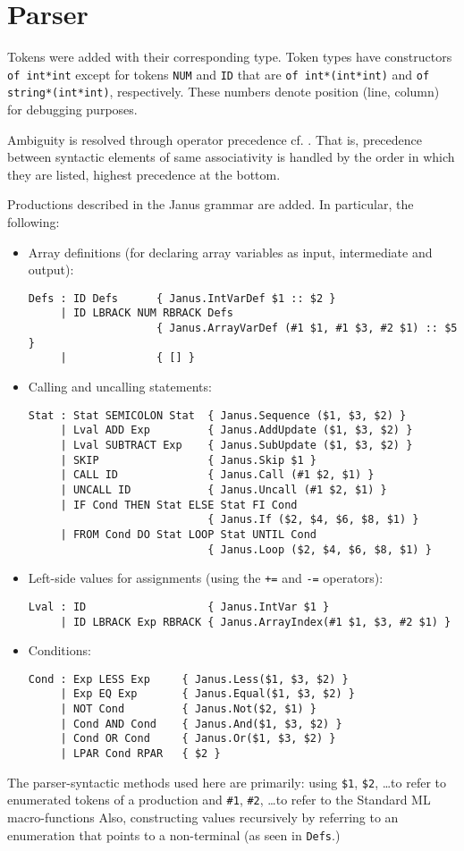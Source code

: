\section{Parser}
Tokens were added with their corresponding type. Token types have constructors
\verb+of int*int+ except for tokens \verb+NUM+ and \verb+ID+ that are
\verb+of int*(int*int)+ and \verb+of string*(int*int)+, respectively. These
numbers denote position (line, column) for debugging purposes.

Ambiguity is resolved through operator precedence cf. \cite[ch. 18.2.2, p.
33]{mosowner}.  That is, precedence between syntactic elements of same
associativity is handled by the order in which they are listed, highest
precedence at the bottom.

Productions described in the Janus grammar are added. In particular, the
following:

\begin{itemize}
  \item Array definitions (for declaring array variables as input, intermediate
        and output):
\begin{verbatim}
Defs : ID Defs      { Janus.IntVarDef $1 :: $2 }
     | ID LBRACK NUM RBRACK Defs
                    { Janus.ArrayVarDef (#1 $1, #1 $3, #2 $1) :: $5 }
     |              { [] }
\end{verbatim}
  \item Calling and uncalling statements:
\begin{verbatim}
Stat : Stat SEMICOLON Stat  { Janus.Sequence ($1, $3, $2) }
     | Lval ADD Exp         { Janus.AddUpdate ($1, $3, $2) }
     | Lval SUBTRACT Exp    { Janus.SubUpdate ($1, $3, $2) }
     | SKIP                 { Janus.Skip $1 }
     | CALL ID              { Janus.Call (#1 $2, $1) }
     | UNCALL ID            { Janus.Uncall (#1 $2, $1) }
     | IF Cond THEN Stat ELSE Stat FI Cond
                            { Janus.If ($2, $4, $6, $8, $1) }
     | FROM Cond DO Stat LOOP Stat UNTIL Cond
                            { Janus.Loop ($2, $4, $6, $8, $1) }
\end{verbatim}
  \item Left-side values for assignments (using the \verb!+=! and \verb!-=!
        operators):
\begin{verbatim}
Lval : ID                   { Janus.IntVar $1 }
     | ID LBRACK Exp RBRACK { Janus.ArrayIndex(#1 $1, $3, #2 $1) }
\end{verbatim}
  \item Conditions:
\begin{verbatim}
Cond : Exp LESS Exp     { Janus.Less($1, $3, $2) }
     | Exp EQ Exp       { Janus.Equal($1, $3, $2) }
     | NOT Cond         { Janus.Not($2, $1) }
     | Cond AND Cond    { Janus.And($1, $3, $2) }
     | Cond OR Cond     { Janus.Or($1, $3, $2) }
     | LPAR Cond RPAR   { $2 }
\end{verbatim}
\end{itemize}

The parser-syntactic methods used here are primarily: using \verb+$1+,
\verb+$2+, \ldots to refer to enumerated tokens of a production and \verb+#1+,
\verb+#2+, \ldots to refer to the Standard ML macro-functions Also, constructing
values recursively by referring to an enumeration that points to a non-terminal
(as seen in \verb+Defs+.)
